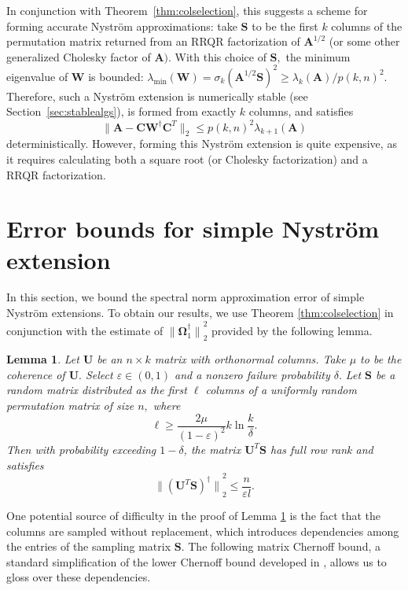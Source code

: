 \documentclass[11pt,letterpaper,twoside,reqno,nosumlimits]{amsart}
\def\pinv{\dagger}
\def\transp{T}
\newcommand{\mat}[1]{\ensuremath{\mathbf{#1}}}
\newcommand{\norm}[1]{\ensuremath{\big\|#1\big\|}}
\newcommand{\snorm}[1]{\ensuremath{\big\|#1\big\|_2}}
\newcommand{\lambdamin}[1]{\ensuremath{\lambda_{\mathrm{min}}\left(#1\right)}}
\newtheorem{lemma}{Lemma}
\theoremstyle{remark}
\begin{document}
In conjunction with Theorem~\ref{thm:colselection}, this suggests a scheme for forming accurate Nystr\"om approximations: take $\mat{S}$ to be the first $k$ columns of the permutation matrix returned from an RRQR factorization of $\mat{A}^{1/2}$ (or some other generalized Cholesky factor of $\mat{A}).$ With this choice of $\mat{S},$ the minimum eigenvalue of $\mat{W}$ is bounded: $\lambdamin{\mat{W}} = \sigma_k(\mat{A}^{1/2} \mat{S})^2 \geq \lambda_k(\mat{A})/p(k,n)^2.$ Therefore, such a Nystr\"om extension is numerically stable (see Section~\ref{sec:stablealgs}), is formed from exactly $k$ columns, and satisfies 
\[
 \snorm{\mat{A} - \mat{C}\mat{W}^\pinv \mat{C}^\transp} \leq p(k,n)^2 \lambda_{k+1}(\mat{A})
\]
deterministically. However, forming this Nystr\"om extension is quite expensive, as it requires calculating both a square root (or Cholesky factorization) and a RRQR factorization.


\section{ Error bounds for simple Nystr\"om extension}
\label{sec:naiveproof}

In this section, we bound the spectral norm approximation error of simple Nystr\"om extensions. To obtain our results, we use Theorem \ref{thm:colselection} in conjunction with the estimate of $\norm{\mat{\Omega}_1^\pinv}_2^2$ provided by the following lemma. 

\begin{lemma}
Let $\mat{U}$ be an $n \times k$ matrix with orthonormal columns. Take $\mu$ to be the coherence of $\mat{U}.$
Select $\varepsilon \in (0,1)$ and a nonzero failure probability $\delta.$ Let $\mat{S}$ be a random matrix distributed as the first $\ell$ columns of a uniformly random permutation matrix of size $n,$ where
\[
 \ell \geq \frac{2\mu}{(1-\varepsilon)^2}k\ln\frac{k}{\delta}.
\]
Then with probability exceeding $1- \delta$, the matrix $\mat{U}^\transp\mat{S}$ has full row rank and satisfies
\[
 \norm{(\mat{U}^\transp \mat{S})^\pinv}_2^2 \leq \frac{n}{\varepsilon l}.
\]
 \label{lem:omega1normbound}
\end{lemma}

One potential source of difficulty in the proof of Lemma \ref{lem:omega1normbound} is the fact that the columns are sampled without replacement, which introduces dependencies among the entries of the sampling matrix $\mat{S}.$ The following matrix Chernoff bound, a standard simplification of the lower Chernoff bound developed in \cite[Theorem 2.2]{T11}, allows us to gloss over these dependencies.
\end{document}
